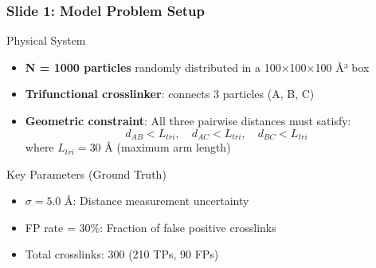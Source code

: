 \documentclass[a4paper,8pt]{beamer}
\begin{document}
\begin{frame}
\frametitle{Slide 1: Model Problem Setup}
\begin{block}{Physical System}
    \begin{itemize}
        \item \textbf{N = 1000 particles} randomly distributed in a 100×100×100 Å³ box
        \item \textbf{Trifunctional crosslinker}: connects 3 particles (A, B, C)
        \item \textbf{Geometric constraint}: All three pairwise distances must satisfy:
        \begin{equation*}
            d_{AB} < L_{tri}, \quad d_{AC} < L_{tri}, \quad d_{BC} < L_{tri}
        \end{equation*}
        where $L_{tri} = 30$ Å (maximum arm length)
    \end{itemize}
\end{block}

\begin{block}{Key Parameters (Ground Truth)}
    \begin{itemize}
        \item $\sigma = 5.0$ Å: Distance measurement uncertainty
        \item FP rate = 30\%: Fraction of false positive crosslinks
        \item Total crosslinks: 300 (210 TPs, 90 FPs)
    \end{itemize}
\end{block}
\end{frame}
\end{document}
